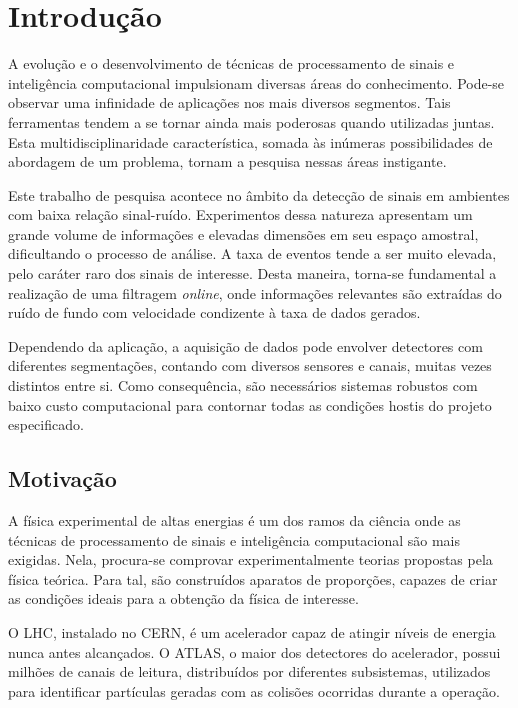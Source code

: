\chapter{Introdução}

A evolução e o desenvolvimento de técnicas de processamento de sinais e
inteligência computacional impulsionam diversas áreas do conhecimento. Pode-se
observar uma infinidade de aplicações nos mais diversos segmentos. Tais
ferramentas tendem a se tornar ainda mais poderosas quando utilizadas juntas.
Esta multidisciplinaridade característica, somada às inúmeras possibilidades de
abordagem de um problema, tornam a pesquisa nessas áreas instigante.

Este trabalho de pesquisa acontece no âmbito da detecção de sinais em ambientes
com baixa relação sinal-ruído. Experimentos dessa natureza apresentam um grande
volume de informações e elevadas dimensões em seu espaço amostral, dificultando
o processo de análise. A taxa de eventos tende a ser muito
elevada, pelo caráter raro dos sinais de interesse. Desta maneira, torna-se
fundamental a realização de uma filtragem \emph{online}, onde informações
relevantes são extraídas do ruído de fundo com velocidade condizente à taxa de
dados gerados.

Dependendo da aplicação, a aquisição de dados pode envolver detectores com
diferentes segmentações, contando com diversos sensores e canais, muitas vezes
distintos entre si.  Como consequência, são necessários sistemas robustos com
baixo custo computacional para contornar todas as condições hostis do projeto
especificado.

\section{Motivação}

A física experimental de altas energias é um dos ramos da ciência onde as
técnicas de processamento de sinais e inteligência computacional são mais
exigidas. Nela, procura-se comprovar experimentalmente teorias propostas pela
física teórica. Para tal, são construídos aparatos de proporções,
capazes de criar as condições ideais para a obtenção da física de interesse.

O LHC, instalado no CERN, é um acelerador capaz de atingir níveis de energia
nunca antes alcançados. O ATLAS, o maior dos detectores do acelerador, possui
milhões de canais de leitura, distribuídos por diferentes subsistemas,
utilizados para identificar partículas geradas com as colisões ocorridas durante
a operação.

